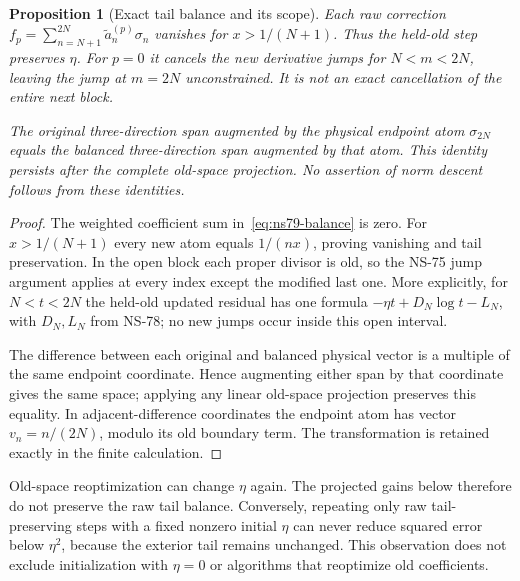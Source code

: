 \documentclass[11pt]{article}
\newtheorem{proposition}[theorem]{Proposition}
\theoremstyle{remark}
\begin{document}
\begin{proposition}[Exact tail balance and its scope]
\label{prop:ns79-balance}
Each raw correction $f_p=\sum_{n=N+1}^{2N}\widetilde a_n^{(p)}\sigma_n$
vanishes for $x>1/(N+1)$. Thus the held-old step preserves $\eta$.
For $p=0$ it cancels the new derivative jumps for $N<m<2N$, leaving
the jump at $m=2N$ unconstrained. It is not an exact cancellation of
the entire next block.

The original three-direction span augmented by the physical endpoint
atom $\sigma_{2N}$ equals the balanced three-direction span augmented
by that atom. This identity persists after the complete old-space
projection. No assertion of norm descent follows from these identities.
\end{proposition}
\begin{proof}
The weighted coefficient sum in~\eqref{eq:ns79-balance} is zero.
For $x>1/(N+1)$ every new atom equals $1/(nx)$, proving vanishing
and tail preservation. In the open block each proper divisor is old,
so the NS-75 jump argument applies at every index except the modified
last one. More explicitly, for $N<t<2N$ the held-old updated residual
has one formula $-\eta t+D_N\log t-L_N$, with $D_N,L_N$ from NS-78;
no new jumps occur inside this open interval.

The difference between each original and balanced physical vector is
a multiple of the same endpoint coordinate. Hence augmenting either
span by that coordinate gives the same space; applying any linear
old-space projection preserves this equality. In adjacent-difference
coordinates the endpoint atom has vector $v_n=n/(2N)$, modulo its
old boundary term. The transformation is retained exactly in the
finite calculation.
\end{proof}

Old-space reoptimization can change $\eta$ again. The projected gains
below therefore do not preserve the raw tail balance. Conversely,
repeating only raw tail-preserving steps with a fixed nonzero initial
$\eta$ can never reduce squared error below $\eta^2$, because the
exterior tail remains unchanged. This observation does not exclude
initialization with $\eta=0$ or algorithms that reoptimize old coefficients.
\end{document}
